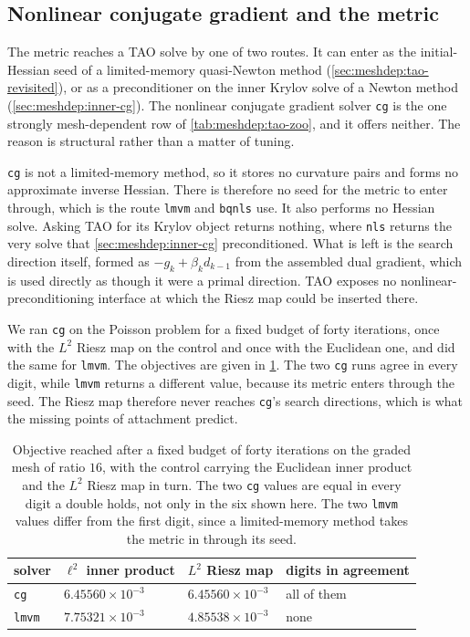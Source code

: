 \documentclass[a4paper,11pt]{article}
\theoremstyle{spacedplain} \newtheorem{theorem}[counter]{Theorem} \newtheorem{lemma}[counter]{Lemma} \newtheorem{prop}[counter]{Proposition} \newtheorem{cor}[counter]{Corollary}
\theoremstyle{spaceddefinition} \newtheorem{defn}[counter]{Definition} \newtheorem{example}[counter]{Example} \newtheorem{remark}[counter]{Remark}
\begin{document}
\subsection{Nonlinear conjugate gradient and the metric}
\label{sec:precond:cg}

The metric reaches a TAO solve by one of two routes. It can enter as the initial-Hessian seed of a limited-memory quasi-Newton method (\cref{sec:meshdep:tao-revisited}), or as a preconditioner on the inner Krylov solve of a Newton method (\cref{sec:meshdep:inner-cg}). The nonlinear conjugate gradient solver \texttt{cg} is the one strongly mesh-dependent row of \cref{tab:meshdep:tao-zoo}, and it offers neither. The reason is structural rather than a matter of tuning.

\texttt{cg} is not a limited-memory method, so it stores no curvature pairs and forms no approximate inverse Hessian. There is therefore no seed for the metric to enter through, which is the route \texttt{lmvm} and \texttt{bqnls} use. It also performs no Hessian solve. Asking TAO for its Krylov object returns nothing, where \texttt{nls} returns the very solve that \cref{sec:meshdep:inner-cg} preconditioned. What is left is the search direction itself, formed as $-g_{k} + \beta_{k} d_{k-1}$ from the assembled dual gradient, which is used directly as though it were a primal direction. TAO exposes no nonlinear-preconditioning interface at which the Riesz map could be inserted there.

We ran \texttt{cg} on the Poisson problem for a fixed budget of forty iterations, once with the $L^{2}$ Riesz map on the control and once with the Euclidean one, and did the same for \texttt{lmvm}. The objectives are given in \cref{tab:precond:cg-metric}. The two \texttt{cg} runs agree in every digit, while \texttt{lmvm} returns a different value, because its metric enters through the seed. The Riesz map therefore never reaches \texttt{cg}'s search directions, which is what the missing points of attachment predict.

\begin{table}[H]
  \centering
  \setlength{\tabcolsep}{10pt}
  \begin{tabular}{l l l l}
    \toprule
    {solver} & {$\ell^{2}$ inner product} & {$L^{2}$ Riesz map} & {digits in agreement} \\
    \midrule
    \texttt{cg}   & $6.45560 \times 10^{-3}$ & $6.45560 \times 10^{-3}$ & all of them \\
    \texttt{lmvm} & $7.75321 \times 10^{-3}$ & $4.85538 \times 10^{-3}$ & none \\
    \bottomrule
  \end{tabular}
  \caption{Objective reached after a fixed budget of forty iterations on the graded mesh of ratio $16$, with the control carrying the Euclidean inner product and the $L^{2}$ Riesz map in turn. The two \texttt{cg} values are equal in every digit a double holds, not only in the six shown here. The two \texttt{lmvm} values differ from the first digit, since a limited-memory method takes the metric in through its seed.}
  \label{tab:precond:cg-metric}
\end{table}
\end{document}
